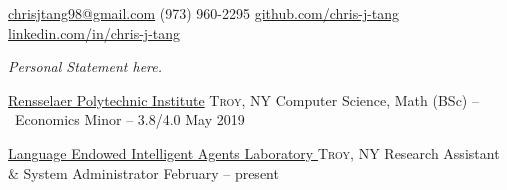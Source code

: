 \documentclass[10pt,a4paper]{article}
\begin{document}
\sloppy  %



\nobreakvspace{0.3em}  %

\noindent\href{mailto:chrisjtang98.at.gmail.dot.com}{chrisjtang98\mbox{}@\mbox{}gmail.com}\sbull
\textsmaller(973) 960-2295\sbull
\href{https://github.com/chris-j-tang}{github.com/chris-j-tang}\sbull
\href{https://www.linkedin.com/in/chris-j-tang/}{linkedin.com/in/chris-j-tang}

\spacedhrule{0.9em}{-0.4em}  %


\vspace{-1.3em}  %
\begin{multicols}{2}  %
\noindent \emph{Personal Statement here.}
\end{multicols}

\spacedhrule{-0.2em}{-0.4em}


\headedsection
  {\href{http://rpi.edu/}{Rensselaer Polytechnic Institute}}
  {\textsc{Troy, NY}} {%
  \headedsubsection
    {Computer Science, Math (BSc) -- \textnormal{~Economics Minor} -- 3.8/4.0}
    {May 2019} {\\}
}

\spacedhrule{0em}{-0.4em}


\headedsection
  {\href{http://www.hass.rpi.edu/pl/hass-research-facilities/?objectID=10049}{Language Endowed Intelligent Agents Laboratory }}
    {\textsc{Troy, NY}} {%
    \headedsubsection
      {Research Assistant \& System Administrator}
      {February  -- present}
      {}
  }
  
\end{document}

